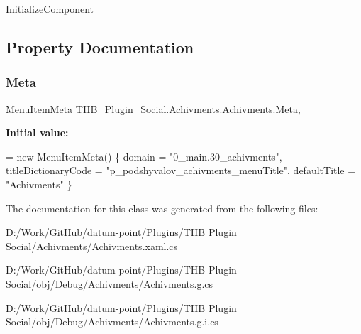 Initialize\+Component 



\subsection{Property Documentation}
\mbox{\label{class_t_h_b___plugin___social_1_1_achivments_1_1_achivments_abd3121deb1475dcaa00041ac8b1a5ba4}} 
\subsubsection{\texorpdfstring{Meta}{Meta}}
{\footnotesize\ttfamily \mbox{\hyperlink{class_uniform_client_1_1_plugins_1_1_menu_item_meta}{Menu\+Item\+Meta}} T\+H\+B\+\_\+\+Plugin\+\_\+\+Social.\+Achivments.\+Achivments.\+Meta\hspace{0.3cm}{\ttfamily [get]}, {\ttfamily [set]}}

{\bfseries Initial value\+:}
\begin{DoxyCode}
= \textcolor{keyword}{new} MenuItemMeta()
        \{
            domain = \textcolor{stringliteral}{"0\_main.30\_achivments"},
            titleDictionaryCode = \textcolor{stringliteral}{"p\_podshyvalov\_achivments\_menuTitle"},
            defaultTitle = \textcolor{stringliteral}{"Achivments"}
        \}
\end{DoxyCode}


The documentation for this class was generated from the following files\+:\begin{DoxyCompactItemize}
\item 
D\+:/\+Work/\+Git\+Hub/datum-\/point/\+Plugins/\+T\+H\+B Plugin Social/\+Achivments/Achivments.\+xaml.\+cs\item 
D\+:/\+Work/\+Git\+Hub/datum-\/point/\+Plugins/\+T\+H\+B Plugin Social/obj/\+Debug/\+Achivments/Achivments.\+g.\+cs\item 
D\+:/\+Work/\+Git\+Hub/datum-\/point/\+Plugins/\+T\+H\+B Plugin Social/obj/\+Debug/\+Achivments/Achivments.\+g.\+i.\+cs\end{DoxyCompactItemize}
